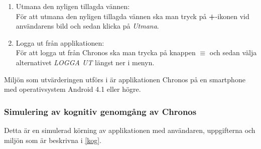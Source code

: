 \documentclass[a4paper, 11pt]{article}
\begin{document}
\begin{enumerate}
\item Utmana den nyligen tillagda vännen:\\
För att utmana den nyligen tillagda vännen ska man tryck på \textbf{+}-ikonen vid användarens bild och sedan klicka på \textit{Utmana}. 

\item Logga ut från applikationen:\\ 
För att logga ut från Chronos ska man trycka på knappen \textbf{$\equiv$} och sedan välja alternativet \textit{LOGGA UT} längst ner i menyn.

\end{enumerate}

Miljön som utvärderingen utförs i är applikationen Chronos på en smartphone med operativsystem Android 4.1 eller högre.

\subsubsection{Simulering av kognitiv genomgång av Chronos}
Detta är en simulerad körning av applikationen med användaren, uppgifterna och miljön som är beskrivna i \ref{kog}.
\end{document}
